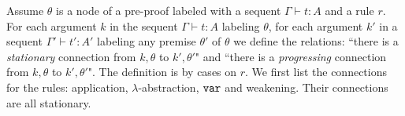 %
%

%

Assume $\theta$ is a node of a pre-proof labeled with a sequent $\Gamma \vdash t:A$
and a rule $r$. For each argument $k$ in the sequent $\Gamma \vdash t:A$ labeling
$\theta$, for each argument  $k'$ in a sequent $\Gamma' \vdash t':A'$ labeling
any premise $\theta'$ of $\theta$ we define
the relations: ``there is a \emph{stationary} connection from $k,\theta$ to $k',\theta'$"
and ``there is a \emph{progressing} connection from $k,\theta$ to $k',\theta'$". 
The definition is by cases on $r$.
We first list the connections for the rules: application, $\lambda$-abstraction, ${\tt var}$
and weakening. Their connections are all stationary.

